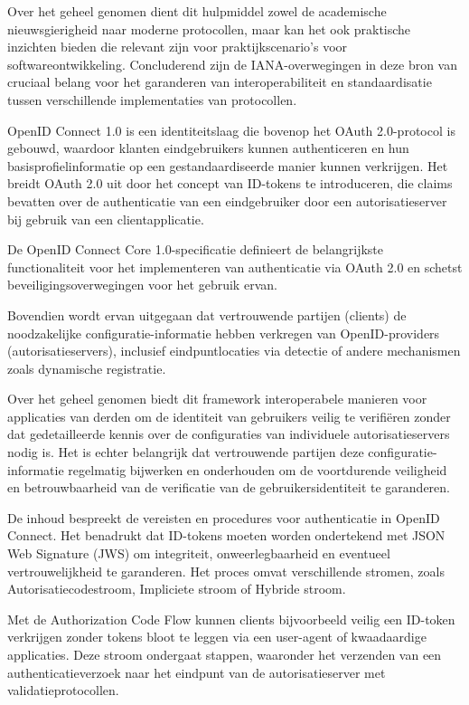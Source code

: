 Over het geheel genomen dient dit hulpmiddel zowel de academische nieuwsgierigheid naar moderne protocollen, maar kan het ook praktische inzichten bieden die relevant zijn voor praktijkscenario's voor softwareontwikkeling.
Concluderend zijn de IANA-overwegingen in deze bron van cruciaal belang voor het garanderen van interoperabiliteit en standaardisatie tussen verschillende implementaties van protocollen.

OpenID Connect 1.0 is een identiteitslaag die bovenop het OAuth 2.0-protocol is gebouwd, waardoor klanten eindgebruikers kunnen authenticeren en hun basisprofielinformatie op een gestandaardiseerde manier kunnen verkrijgen. Het breidt OAuth 2.0 uit door het concept van ID-tokens te introduceren, die claims bevatten over de authenticatie van een eindgebruiker door een autorisatieserver bij gebruik van een clientapplicatie.

De OpenID Connect Core 1.0-specificatie definieert de belangrijkste functionaliteit voor het implementeren van authenticatie via OAuth 2.0 en schetst beveiligingsoverwegingen voor het gebruik ervan.

Bovendien wordt ervan uitgegaan dat vertrouwende partijen (clients) de noodzakelijke configuratie-informatie hebben verkregen van OpenID-providers (autorisatieservers), inclusief eindpuntlocaties via detectie of andere mechanismen zoals dynamische registratie.

Over het geheel genomen biedt dit framework interoperabele manieren voor applicaties van derden om de identiteit van gebruikers veilig te verifiëren zonder dat gedetailleerde kennis over de configuraties van individuele autorisatieservers nodig is.
Het is echter belangrijk dat vertrouwende partijen deze configuratie-informatie regelmatig bijwerken en onderhouden om de voortdurende veiligheid en betrouwbaarheid van de verificatie van de gebruikersidentiteit te garanderen.

De inhoud bespreekt de vereisten en procedures voor authenticatie in OpenID Connect. Het benadrukt dat ID-tokens moeten worden ondertekend met JSON Web Signature (JWS) om integriteit, onweerlegbaarheid en eventueel vertrouwelijkheid te garanderen. Het proces omvat verschillende stromen, zoals Autorisatiecodestroom, Impliciete stroom of Hybride stroom.

Met de Authorization Code Flow kunnen clients bijvoorbeeld veilig een ID-token verkrijgen zonder tokens bloot te leggen via een user-agent of kwaadaardige applicaties. Deze stroom ondergaat stappen, waaronder het verzenden van een authenticatieverzoek naar het eindpunt van de autorisatieserver met validatieprotocollen.

